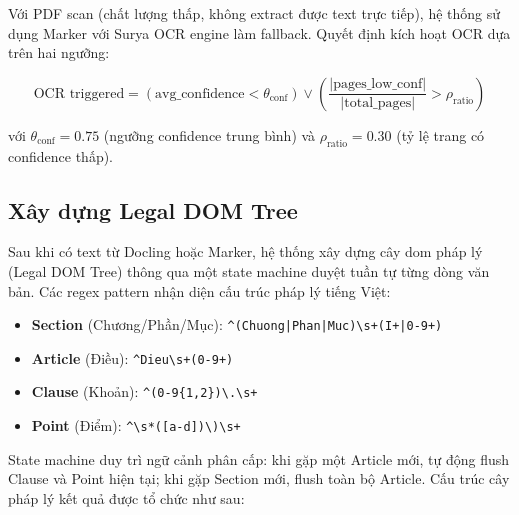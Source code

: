 Với PDF scan (chất lượng thấp, không extract được text trực tiếp), hệ thống sử dụng Marker \cite{marker2024} với Surya OCR engine \cite{surya2024} làm fallback. Quyết định kích hoạt OCR dựa trên hai ngưỡng:

\begin{equation}
    \text{OCR triggered} = (\text{avg\_confidence} < \theta_{\text{conf}}) \lor \left(\frac{|\text{pages\_low\_conf}|}{|\text{total\_pages}|} > \rho_{\text{ratio}}\right)
    \label{eq:ocr_trigger}
\end{equation}

với $\theta_{\text{conf}} = 0.75$ (ngưỡng confidence trung bình) và $\rho_{\text{ratio}} = 0.30$ (tỷ lệ trang có confidence thấp).

\subsection{Xây dựng Legal DOM Tree}

Sau khi có text từ Docling hoặc Marker, hệ thống xây dựng cây \gls{dom} pháp lý (Legal DOM Tree) thông qua một state machine duyệt tuần tự từng dòng văn bản. Các regex pattern nhận diện cấu trúc pháp lý tiếng Việt:

\begin{itemize}
    \item \textbf{Section} (Chương/Phần/Mục): \texttt{\^{}(Chuong|Phan|Muc)\textbackslash s+(I+|0-9+)}
    \item \textbf{Article} (Điều): \texttt{\^{}Dieu\textbackslash s+(0-9+)}
    \item \textbf{Clause} (Khoản): \texttt{\^{}(0-9\{1,2\})\textbackslash .\textbackslash s+}
    \item \textbf{Point} (Điểm): \texttt{\^{}\textbackslash s*([a-d])\textbackslash)\textbackslash s+}
\end{itemize}

State machine duy trì ngữ cảnh phân cấp: khi gặp một Article mới, tự động flush Clause và Point hiện tại; khi gặp Section mới, flush toàn bộ Article. Cấu trúc cây pháp lý kết quả được tổ chức như sau:

